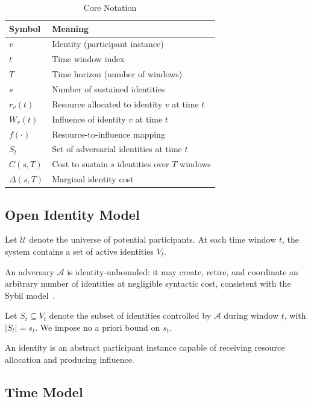 \documentclass[journal]{IEEEtran}
\begin{document}
	\begin{table}[t]
		\centering
		\small
		\caption{Core Notation}
		\label{tab:notation}
		
		\begin{tabular}{ll}
			\toprule
			\textbf{Symbol} & \textbf{Meaning} \\
			\midrule
			$v$ & Identity (participant instance) \\
			$t$ & Time window index \\
			$T$ & Time horizon (number of windows) \\
			$s$ & Number of sustained identities \\
			$r_v(t)$ & Resource allocated to identity $v$ at time $t$ \\
			$W_v(t)$ & Influence of identity $v$ at time $t$ \\
			$f(\cdot)$ & Resource-to-influence mapping \\
			$S_t$ & Set of adversarial identities at time $t$ \\
			$C(s,T)$ & Cost to sustain $s$ identities over $T$ windows \\
			$\Delta(s,T)$ & Marginal identity cost \\
			\bottomrule
		\end{tabular}
		
	\end{table}
	
	\subsection{Open Identity Model}
	
	Let $\mathcal{U}$ denote the universe of potential participants.
	At each time window $t$, the system contains a set of active identities $V_t$.
	
	An adversary $\mathcal{A}$ is identity-unbounded:
	it may create, retire, and coordinate an arbitrary number of identities
	at negligible syntactic cost, consistent with the Sybil model~\cite{douceur2002sybil}.
	
	Let $S_t \subseteq V_t$ denote the subset of identities
	controlled by $\mathcal{A}$ during window $t$,
	with $|S_t| = s_t$.
	We impose no a priori bound on $s_t$.
	
	An identity is an abstract participant instance
	capable of receiving resource allocation and producing influence.
	
	\subsection{Time Model}
	
\end{document}
